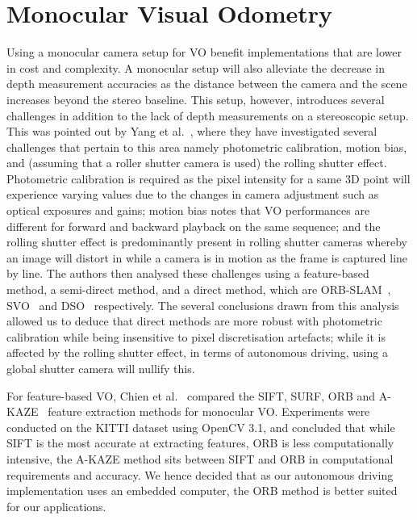 \section{Monocular Visual Odometry}\label{sec:3:mvo}
Using a monocular camera setup for VO benefit implementations that are lower in cost and complexity. A monocular setup will also alleviate the decrease in depth measurement accuracies as the distance between the camera and the scene increases beyond the stereo baseline. This setup, however, introduces several challenges in addition to the lack of depth measurements on a stereoscopic setup. This was pointed out by Yang et al.~\cite{yang_challenges_2017}, where they have investigated several challenges that pertain to this area namely photometric calibration, motion bias, and (assuming that a roller shutter camera is used) the rolling shutter effect. Photometric calibration is required as the pixel intensity for a same 3D point will experience varying values due to the changes in camera adjustment such as optical exposures and gains; motion bias notes that VO performances are different for forward and backward playback on the same sequence; and the rolling shutter effect is predominantly present in rolling shutter cameras whereby an image will distort in while a camera is in motion as the frame is captured line by line. The authors then analysed these challenges using a feature-based method, a semi-direct method, and a direct method, which are ORB-SLAM~\cite{mur-artal_orb-slam2:_2017}, SVO~\cite{forster_svo:_2017} and DSO~\cite{engel_direct_2018} respectively. The several conclusions drawn from this analysis allowed us to deduce that direct methods are more robust with photometric calibration while being insensitive to pixel discretisation artefacts; while it is affected by the rolling shutter effect, in terms of autonomous driving, using a global shutter camera will nullify this. 


For feature-based VO, Chien et al.~\cite{chien_when_2016} compared the SIFT, SURF, ORB and A-KAZE~\cite{alcantarilla_fast_2013} feature extraction methods for monocular VO. Experiments were conducted on the KITTI dataset using OpenCV 3.1, and concluded that while SIFT is the most accurate at extracting features, ORB is less computationally intensive, the A-KAZE method sits between SIFT and ORB in computational requirements and accuracy. We hence decided that as our autonomous driving implementation uses an embedded computer, the ORB method is better suited for our applications. 

